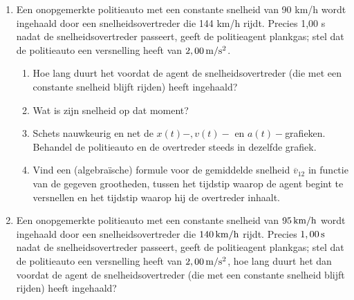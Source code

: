 \begin{enumerate}

\item Een onopgemerkte politieauto met
een constante snelheid van 90 km/h wordt ingehaald door een
snelheidsovertreder die 144 km/h rijdt. Precies 1,00 s nadat de
snelheidsovertreder passeert, geeft de politieagent plankgas; stel
dat de politieauto een versnelling heeft van $2,00\rm\,m/s^2$.
\begin{enumerate}
\item Hoe lang duurt het voordat de agent de snelheidsovertreder
(die met een constante snelheid blijft rijden) heeft ingehaald?
\item Wat is zijn snelheid op dat moment?
\item Schets nauwkeurig en net de $x(t)-,v(t)-$ en $a(t)-$grafieken.
Behandel de politieauto en de overtreder steeds in dezelfde grafiek.
\item Vind een (algebra\"ische) formule voor de gemiddelde snelheid $\overline{v}_{12}$ in
functie van de gegeven grootheden, tussen het tijdstip waarop de
agent begint te versnellen en het tijdstip waarop hij de overtreder
inhaalt.
\end{enumerate}

\item Een onopgemerkte politieauto met een constante snelheid van $95\rm\,km/h$ wordt ingehaald door een snelheidsovertreder die $140\rm\,km/h$ rijdt. Precies $1,00\rm\,s$ nadat de snelheidsovertreder passeert, geeft de politieagent plankgas; stel dat de politieauto een versnelling heeft van $2,00\rm\,m/s^2$, hoe lang duurt het dan voordat de agent de snelheidsovertreder (die met een constante snelheid blijft rijden) heeft ingehaald? 



\end{enumerate}

